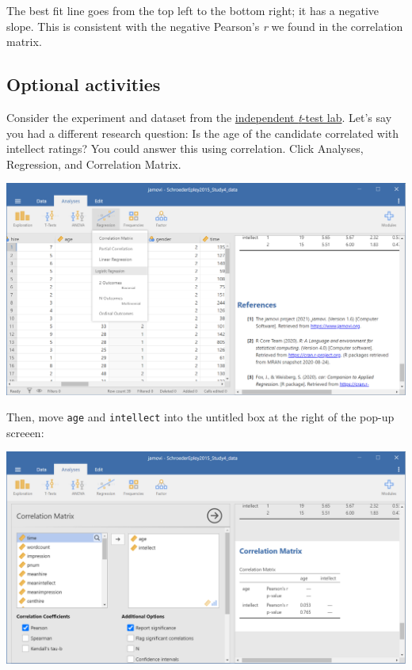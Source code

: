 \documentclass[
]{book}
\begin{document}
The best fit line goes from the top left to the bottom right; it has a negative slope. This is consistent with the negative Pearson's \emph{r} we found in the correlation matrix.

\hypertarget{optional-activities-1}{%
\subsection{Optional activities}\label{optional-activities-1}}

Consider the experiment and dataset from the \href{https://www.erinmazerolle.com/statisticsLab/lab-5-t-test-independent-sample.html\#jamovi}{independent \emph{t}-test lab}. Let's say you had a different research question: Is the age of the candidate correlated with intellect ratings? You could answer this using correlation. Click {Analyses}, {Regression}, and {Correlation Matrix}.

\includegraphics{img/7.4.61.png}

Then, move \texttt{age} and \texttt{intellect} into the untitled box at the right of the pop-up screeen:

\includegraphics{img/7.4.62.png}
\end{document}
